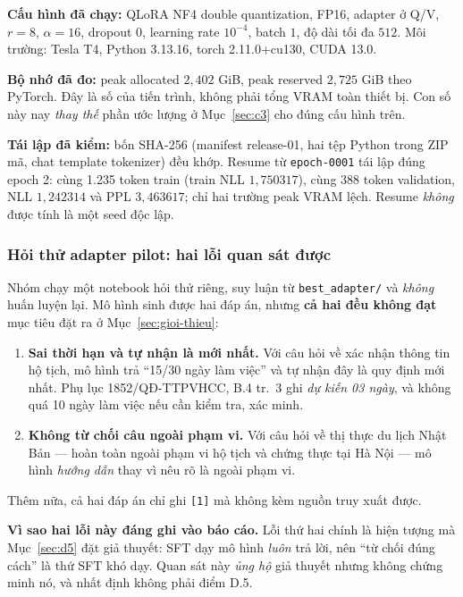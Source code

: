 \textbf{Cấu hình đã chạy:} QLoRA NF4 double quantization, FP16, adapter ở Q/V,
$r=8$, $\alpha=16$, dropout $0$, learning rate $10^{-4}$, batch $1$, độ dài tối đa
$512$. Môi trường: Tesla T4, Python 3.13.16, torch 2.11.0+cu130, CUDA 13.0.

\textbf{Bộ nhớ đã đo:} peak allocated $2{,}402$ GiB, peak reserved $2{,}725$ GiB
theo PyTorch. Đây là số của tiến trình, không phải tổng VRAM toàn thiết bị. Con số
này nay \emph{thay thế} phần ước lượng ở Mục~\ref{sec:c3} cho đúng cấu hình trên.

\textbf{Tái lập đã kiểm:} bốn SHA-256 (manifest release-01, hai tệp Python trong
ZIP mã, chat template tokenizer) đều khớp. Resume từ \texttt{epoch-0001} tái lập
đúng epoch 2: cùng 1.235 token train (train NLL $1{,}750317$), cùng 388 token
validation, NLL $1{,}242314$ và PPL $3{,}463617$; chỉ hai trường peak VRAM lệch.
Resume \emph{không} được tính là một seed độc lập.

\subsubsection{Hỏi thử adapter pilot: hai lỗi quan sát được}

Nhóm chạy một notebook hỏi thử riêng, suy luận từ \texttt{best\_adapter/} và
\emph{không} huấn luyện lại. Mô hình sinh được hai đáp án, nhưng \textbf{cả hai
đều không đạt} mục tiêu đặt ra ở Mục~\ref{sec:gioi-thieu}:

\begin{enumerate}[leftmargin=2em]
\item \textbf{Sai thời hạn và tự nhận là mới nhất.} Với câu hỏi về xác nhận
thông tin hộ tịch, mô hình trả ``15/30 ngày làm việc'' và tự nhận đây là quy định
mới nhất. Phụ lục 1852/QĐ-TTPVHCC, B.4 tr.~3 ghi \emph{dự kiến 03 ngày}, và không
quá 10 ngày làm việc nếu cần kiểm tra, xác minh.
\item \textbf{Không từ chối câu ngoài phạm vi.} Với câu hỏi về thị thực du lịch
Nhật Bản --- hoàn toàn ngoài phạm vi hộ tịch và chứng thực tại Hà Nội --- mô hình
\emph{hướng dẫn} thay vì nêu rõ là ngoài phạm vi.
\end{enumerate}

Thêm nữa, cả hai đáp án chỉ ghi \texttt{[1]} mà không kèm nguồn truy xuất được.

\textbf{Vì sao hai lỗi này đáng ghi vào báo cáo.} Lỗi thứ hai chính là hiện tượng
mà Mục~\ref{sec:d5} đặt giả thuyết: SFT dạy mô hình \emph{luôn} trả lời, nên
``từ chối đúng cách'' là thứ SFT khó dạy. Quan sát này \emph{ủng hộ} giả thuyết
nhưng không chứng minh nó, và nhất định không phải điểm D.5.

